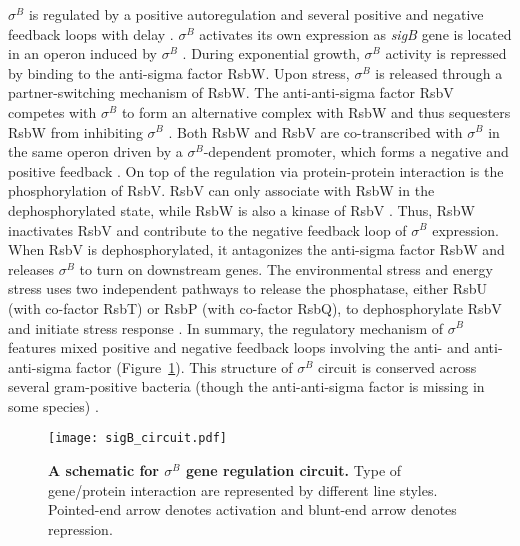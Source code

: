 $\sigma^B$ is regulated by a positive autoregulation and 
several positive and negative feedback loops with delay
\cite{alper96, hecker07}.
$\sigma^B$ activates its own expression as \textit{sigB}
gene is located in an operon induced by $\sigma^B$
\cite{kalman90}.
During exponential growth, $\sigma^B$ activity is repressed by 
binding to the anti-sigma factor RsbW.
Upon stress, $\sigma^B$ is released through a partner-switching 
mechanism of RsbW.
The anti-anti-sigma factor RsbV
competes with $\sigma^B$ to form an alternative complex with RsbW
and thus sequesters RsbW from inhibiting $\sigma^B$ \cite{alper96}.
Both RsbW and RsbV are co-transcribed with $\sigma^B$ in the
same operon driven by a $\sigma^B$-dependent promoter, 
which forms a negative and positive feedback
\cite{kalman90}.
On top of the regulation via protein-protein interaction is the
phosphorylation of RsbV.
RsbV can only associate with RsbW in the dephosphorylated state,
while RsbW is also a kinase of RsbV \cite{dufour94}.
Thus, RsbW inactivates RsbV and contribute to the negative feedback
loop of $\sigma^B$ expression.
When RsbV is dephosphorylated, it antagonizes the anti-sigma factor
RsbW and releases $\sigma^B$ to turn on downstream genes.
The environmental stress and energy stress uses two independent 
pathways to release the phosphatase, either RsbU (with co-factor RsbT)
or RsbP (with co-factor RsbQ), to dephosphorylate RsbV
and initiate stress response \cite{voelker95}.
In summary, the regulatory mechanism of $\sigma^B$ features
mixed positive and negative feedback
loops involving the anti- and anti-anti-sigma factor
(Figure~\ref{fig:sigB_circuit}).
This structure of $\sigma^B$ circuit is conserved across
several gram-positive bacteria (though the anti-anti-sigma
factor is missing in some species) \cite{hecker07}.

\begin{figure}[ht]
    \centering
    \texttt{[image: sigB\_circuit.pdf]}
    \caption[
        A schematic for $\sigma^B$ gene regulation circuit.
        ]{
        \textbf{A schematic for $\sigma^B$ gene regulation circuit.}
        Type of gene/protein interaction are represented by
        different line styles.
        Pointed-end arrow denotes activation and blunt-end
        arrow denotes repression.
    }
    \label{fig:sigB_circuit}
\end{figure}

